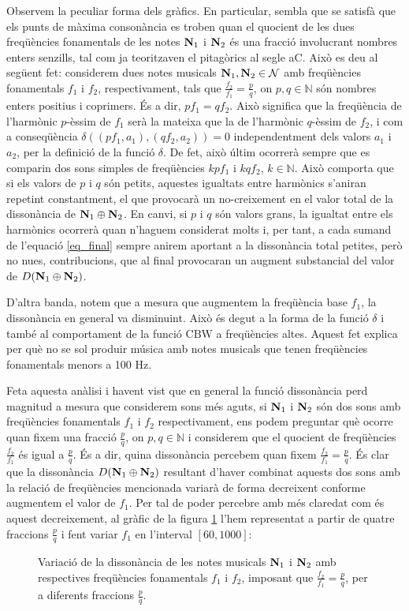 \documentclass{article}
\theoremstyle{math}
\theoremstyle{TheoremNum}
\newcommand{\0}{\ensuremath{\vb{0}}}
\newcommand{\N}{\ensuremath{\vb{N}}}
\newcommand{\NN}{\ensuremath{\mathbb{N}}} %
\begin{document}
Observem la peculiar forma dels gràfics. En particular, sembla que se satisfà que els punts de màxima consonància es troben quan el quocient de les dues freqüències fonamentals de les notes $\N_1$ i $\N_2$ és una fracció involucrant nombres enters senzills, tal com ja teoritzaven el pitagòrics al segle \MakeUppercase{} aC. Això es deu al següent fet: considerem dues notes musicals $\N_1,\N_2\in\mathcal{N}$ amb freqüències fonamentals $f_1$ i $f_2$, respectivament, tals que $\frac{f_2}{f_1}=\frac{p}{q}$, on $p,q\in\NN$ són nombres enters positius i coprimers. És a dir, $pf_1=qf_2$. Això significa que la freqüència de l'harmònic $p$-èssim de $f_1$ serà la mateixa que la de l'harmònic $q$-èssim de $f_2$, i com a conseqüència $\delta((pf_1,a_1),(qf_2,a_2))=0$ independentment dels valors $a_1$ i $a_2$, per la definició de la funció $\delta$. De fet, això últim ocorrerà sempre que es comparin dos sons simples de freqüències $kpf_1$ i $kqf_2$, $k\in\NN$. Això comporta que si els valors de $p$ i $q$ són petits, aquestes igualtats entre harmònics s'aniran repetint constantment, el que provocarà un no-creixement en el valor total de la dissonància de $\N_1\oplus\N_2$. En canvi, si $p$ i $q$ són valors grans, la igualtat entre els harmònics ocorrerà quan n'haguem considerat molts i, per tant, a cada sumand de l'equació \eqref{eq_final} sempre anirem aportant a la dissonància total petites, però no nu\lgem es, contribucions, que al final provocaran un augment substancial del valor de $D(\N_1\oplus\N_2)$.\par
D'altra banda, notem que a mesura que augmentem la freqüència base $f_1$, la dissonància en general va disminuint. Això és degut a la forma de la funció $\delta$ i també al comportament de la funció $\text{CBW}$ a freqüències altes. Aquest fet explica per què no se sol produir música amb notes musicals que tenen freqüències fonamentals menors a 100 Hz.\par Feta aquesta anàlisi i havent vist que en general la funció dissonància perd magnitud a mesura que considerem sons més aguts, si $\N_1$ i $\N_2$ són dos sons amb freqüències fonamentals $f_1$ i $f_2$ respectivament, ens podem preguntar què ocorre quan fixem una fracció $\frac{p}{q}$, on $p,q\in\NN$ i considerem que el quocient de freqüències $\frac{f_2}{f_1}$ és igual a $\frac{p}{q}$. És a dir, quina dissonància percebem quan fixem $\frac{f_2}{f_1}=\frac{p}{q}$. És clar que la dissonància $D(\N_1\oplus\N_2)$ resultant d'haver combinat aquests dos sons amb la relació de freqüències mencionada variarà de forma decreixent conforme augmentem el valor de $f_1$. Per tal de poder percebre amb més claredat com és aquest decreixement, al gràfic de la figura \ref{fraccio_pq} l'hem representat a partir de quatre fraccions $\frac{p}{q}$ i fent variar $f_1$ en l'interval $[60,1000]$:
\begin{figure}[ht]
    \centering
    
    \caption{Variació de la dissonància de les notes musicals $\N_1$ i $\N_2$ amb respectives freqüències fonamentals $f_1$ i $f_2$, imposant que $\frac{f_2}{f_1}=\frac{p}{q}$, per a diferents fraccions $\frac{p}{q}$.}
    \label{fraccio_pq}
\end{figure}
\end{document}
